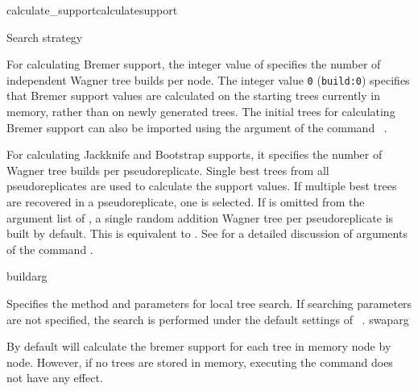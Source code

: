 \begin{command}{calculate\_support}{calculatesupport}
\begin{arguments}
\begin{argumentgroup}{Search strategy}
             {For calculating Bremer support, the integer value of
              specifies the number of independent
             Wagner tree builds per node. The integer value \texttt{0}
             (\texttt{build:0}) specifies that Bremer support values are
             calculated on the starting trees currently
             in memory, rather than on newly generated trees.
             The initial trees for calculating Bremer support
             can also be imported using the argument 
             of the command ~.
             
             For calculating Jackknife
             and Bootstrap supports, it specifies the number of
             Wagner tree builds per pseudoreplicate.  Single best trees from all
             pseudoreplicates are used to calculate the support values. If
             multiple best trees are recovered in a pseudoreplicate, one 
             is selected. If  is
             omitted from the argument list of ,
             a single random addition Wagner tree per
             pseudoreplicate is built by default. This is equivalent to 
             . See
              for a detailed discussion of
             arguments of the command .}
             {buildarg}

            {Specifies the method and parameters for local tree search. If searching
            parameters are not specified, the search is performed under
            the default settings of ~.} 
            {swaparg}
	     
        		\end{argumentgroup}

	\end{arguments}

    {By default \poy will calculate the bremer support for each tree in memory node by node.
    However, if no trees are stored in memory, executing the command
     does not have any effect.}
    
    


\end{command}
